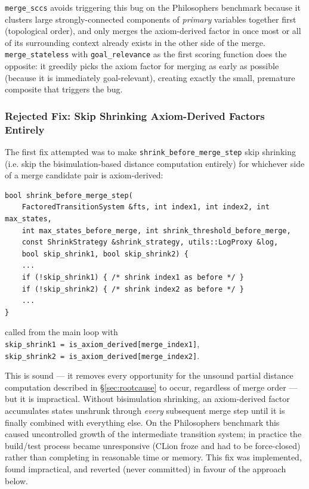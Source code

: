 \documentclass[11pt,a4paper]{article}
\begin{document}
\texttt{merge\_sccs} avoids triggering this bug on the Philosophers benchmark
because it clusters large strongly-connected components of \emph{primary}
variables together first (topological order), and only merges the
axiom-derived factor in once most or all of its surrounding context already
exists in the other side of the merge. \texttt{merge\_stateless} with
\texttt{goal\_relevance} as the first scoring function does the opposite: it
greedily picks the axiom factor for merging as early as possible (because it
is immediately goal-relevant), creating exactly the small, premature
composite that triggers the bug.

\subsubsection{Rejected Fix: Skip Shrinking Axiom-Derived Factors Entirely}

The first fix attempted was to make \texttt{shrink\_before\_merge\_step} skip
shrinking (i.e. skip the bisimulation-based distance computation entirely)
for whichever side of a merge candidate pair is axiom-derived:
\begin{lstlisting}
bool shrink_before_merge_step(
    FactoredTransitionSystem &fts, int index1, int index2, int max_states,
    int max_states_before_merge, int shrink_threshold_before_merge,
    const ShrinkStrategy &shrink_strategy, utils::LogProxy &log,
    bool skip_shrink1, bool skip_shrink2) {
    ...
    if (!skip_shrink1) { /* shrink index1 as before */ }
    if (!skip_shrink2) { /* shrink index2 as before */ }
    ...
}
\end{lstlisting}
called from the main loop with
\texttt{skip\_shrink1~=~is\_axiom\_derived[merge\_index1]},
\texttt{skip\_shrink2~=~is\_axiom\_derived[merge\_index2]}.

This is sound --- it removes every opportunity for the unsound partial
distance computation described in \S\ref{sec:rootcause} to occur, regardless
of merge order --- but it is impractical. Without bisimulation shrinking, an
axiom-derived factor accumulates states unshrunk through \emph{every}
subsequent merge step until it is finally combined with everything else.
On the Philosophers benchmark this caused uncontrolled growth of the
intermediate transition system; in practice the build/test process became
unresponsive (CLion froze and had to be force-closed) rather than completing
in reasonable time or memory. This fix was implemented, found impractical,
and reverted (never committed) in favour of the approach below.
\end{document}
